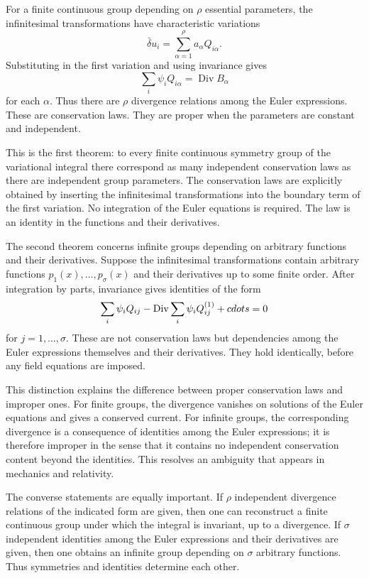 \documentclass[12pt]{article}
\begin{document}
For a finite continuous group depending on \(\rho\) essential parameters, the infinitesimal
transformations have characteristic variations \[   \bar\delta u_i=\sum_{\alpha=1}^\rho a_\alpha
Q_{i\alpha}. \] Substituting in the first variation and using invariance gives \[   \sum_i \psi_i
Q_{i\alpha}=\operatorname{Div} B_\alpha \] for each \(\alpha\). Thus there are \(\rho\) divergence
relations among the Euler expressions. These are conservation laws. They are proper when the
parameters are constant and independent.


This is the first theorem: to every finite continuous symmetry group of the variational integral
there correspond as many independent conservation laws as there are independent group parameters.
The conservation laws are explicitly obtained by inserting the infinitesimal transformations into
the boundary term of the first variation. No integration of the Euler equations is required. The law
is an identity in the functions and their derivatives.


The second theorem concerns infinite groups depending on arbitrary functions and their derivatives.
Suppose the infinitesimal transformations contain arbitrary functions \(p_1(x), \ldots,p_\sigma(x)\)
and their derivatives up to some finite order. After integration by parts, invariance gives
identities of the form \[   \sum_i \psi_i Q_{ij}-\operatorname{Div}\sum_i \psi_i
Q_{ij}^{(1)}+\\cdots=0 \] for \(j=1, \ldots, \sigma\). These are not conservation laws but
dependencies among the Euler expressions themselves and their derivatives. They hold identically,
before any field equations are imposed.


This distinction explains the difference between proper conservation laws and improper ones. For
finite groups, the divergence vanishes on solutions of the Euler equations and gives a conserved
current. For infinite groups, the corresponding divergence is a consequence of identities among the
Euler expressions; it is therefore improper in the sense that it contains no independent
conservation content beyond the identities. This resolves an ambiguity that appears in mechanics and
relativity.


The converse statements are equally important. If \(\rho\) independent divergence relations of the
indicated form are given, then one can reconstruct a finite continuous group under which the
integral is invariant, up to a divergence. If \(\sigma\) independent identities among the Euler
expressions and their derivatives are given, then one obtains an infinite group depending on
\(\sigma\) arbitrary functions. Thus symmetries and identities determine each other.
\end{document}

